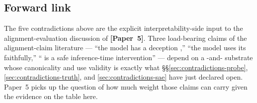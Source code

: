 \subsection{Forward link}
\label{sec:contradictions-forward}

The five contradictions above are the explicit interpretability-side
input to the alignment-evaluation discussion of \textbf{[Paper~5]}.
Three load-bearing claims of the alignment-claim literature ---
``the model has a deception ,'' ``the model uses its 
faithfully,'' `` is a safe inference-time
intervention'' --- depend on a -and- substrate whose
canonicality and use validity is exactly what \S\S\ref{sec:contradictions-probe},
\ref{sec:contradictions-truth}, and \ref{sec:contradictions-sae} have
just declared open. Paper~5 picks up the question of how much weight
those claims can carry given the evidence on the table here.
